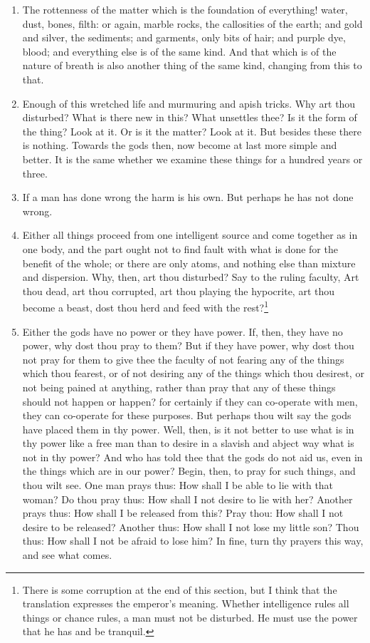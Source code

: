 \begin{enumerate}
\item The rottenness of the matter which is the foundation of everything! water, dust, bones, filth: or again, marble rocks, the callosities of the earth; and gold and silver, the sediments; and garments, only bits of hair; and purple dye, blood; and everything else is of the same kind. And that which is of the nature of breath is also another thing of the same kind, changing from this to that.

\item Enough of this wretched life and murmuring and apish tricks. Why art thou disturbed? What is there new in this? What unsettles thee? Is it the form of the thing? Look at it. Or is it the matter? Look at it. But besides these there is nothing. Towards the gods then, now become at last more simple and better. It is the same whether we examine these things for a hundred years or three.

\item If a man has done wrong the harm is his own. But perhaps he has not done wrong.

\item Either all things proceed from one intelligent source and come together as in one body, and the part ought not to find fault with what is done for the benefit of the whole; or there are only atoms, and nothing else than mixture and dispersion. Why, then, art thou disturbed? Say to the ruling faculty, Art thou dead, art thou corrupted, art thou playing the hypocrite, art thou become a beast, dost thou herd and feed with the rest?\footnote{There is some corruption at the end of this section, but I think that the translation expresses the emperor's meaning. Whether intelligence rules all things or chance rules, a man must not be disturbed. He must use the power that he has and be tranquil.}

\item Either the gods have no power or they have power. If, then, they have no power, why dost thou pray to them? But if they have power, why dost thou not pray for them to give thee the faculty of not fearing any of the things which thou fearest, or of not desiring any of the things which thou desirest, or not being pained at anything, rather than pray that any of these things should not happen or happen? for certainly if they can co-operate with men, they can co-operate for these purposes. But perhaps thou wilt say the gods have placed them in thy power. Well, then, is it not better to use what is in thy power like a free man than to desire in a slavish and abject way what is not in thy power? And who has told thee that the gods do not aid us, even in the things which are in our power? Begin, then, to pray for such things, and thou wilt see. One man prays thus: How shall I be able to lie with that woman? Do thou pray thus: How shall I not desire to lie with her? Another prays thus: How shall I be released from this? Pray thou: How shall I not desire to be released? Another thus: How shall I not lose my little son? Thou thus: How shall I not be afraid to lose him? In fine, turn thy prayers this way, and see what comes.


\end{enumerate}
